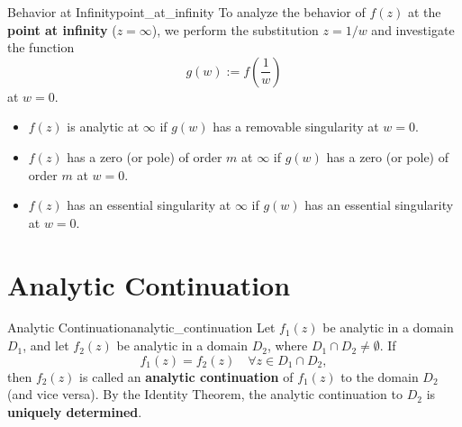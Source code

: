 \begin{definition}{Behavior at Infinity}{point_at_infinity}
To analyze the behavior of $f(z)$ at the \textbf{point at infinity} ($z = \infty$), we perform the substitution $z = 1/w$ and investigate the function
\begin{equation}
g(w) := f\left(\frac{1}{w}\right)
\end{equation}
at $w = 0$.
\begin{itemize}
    \item $f(z)$ is analytic at $\infty$ if $g(w)$ has a removable singularity at $w = 0$.
    \item $f(z)$ has a zero (or pole) of order $m$ at $\infty$ if $g(w)$ has a zero (or pole) of order $m$ at $w = 0$.
    \item $f(z)$ has an essential singularity at $\infty$ if $g(w)$ has an essential singularity at $w = 0$.
\end{itemize}
\end{definition}


\section{Analytic Continuation}

\begin{definition}{Analytic Continuation}{analytic_continuation}
Let $f_1(z)$ be analytic in a domain $D_1$, and let $f_2(z)$ be analytic in a domain $D_2$, where $D_1 \cap D_2 \neq \emptyset$.
If
\begin{equation}
f_1(z) = f_2(z) \quad \forall z \in D_1 \cap D_2,
\end{equation}
then $f_2(z)$ is called an \textbf{analytic continuation} of $f_1(z)$ to the domain $D_2$ (and vice versa).
By the Identity Theorem, the analytic continuation to $D_2$ is \textbf{uniquely determined}.
\end{definition}
